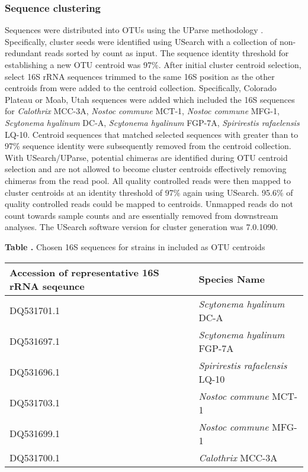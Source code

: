 \subsubsection{Sequence clustering}
Sequences were distributed into OTUs using the UParse methodology
\citep{23955772}. Specifically, cluster seeds were identified using USearch with
a collection of non-redundant reads sorted by count as input. The sequence
identity threshold for establishing a new OTU centroid was 97\%. After initial
cluster centroid selection, select 16S rRNA sequences trimmed to the same 16S
position as the other centroids from \citet{Yeager} were added to the centroid
collection. Specifically, \citet{Yeager} Colorado Plateau or Moab, Utah
sequences were added which included the 16S sequences for \textit{Calothrix}
MCC-3A, \textit{Nostoc commune} MCT-1, \textit{Nostoc commune} MFG-1,
\textit{Scytonema hyalinum} DC-A, \textit{Scytonema hyalinum} FGP-7A,
\textit{Spirirestis rafaelensis} LQ-10. Centroid sequences that matched
selected \citet{Yeager} sequences with greater than to 97\% sequence identity
were subsequently removed from the centroid collection. With USearch/UParse,
potential chimeras are identified during OTU centroid selection
and are not allowed to become cluster centroids effectively removing chimeras
from the read pool. All quality controlled reads were then mapped to cluster
centroids at an identity threshold of 97\% again using USearch. 95.6\% of
quality controlled reads could be mapped to centroids. Unmapped reads do not
count towards sample counts and are essentially removed from downstream
analyses. The USearch software version for cluster generation was 7.0.1090.

\begin{table}

\textbf{
\label{table:yeager_2006} 
Table . }{Chosen 16S sequences for strains in \citet{Yeager} included as OTU centroids}

{\begin{tabular}{ l l }
\toprule
\textbf{Accession of representative 16S rRNA seqeunce} & \textbf{Species Name} \\ \midrule 
DQ531701.1 & \textit{Scytonema hyalinum} DC-A \\ \midrule 
DQ531697.1 & \textit{Scytonema hyalinum} FGP-7A \\ \midrule
DQ531696.1 & \textit{Spirirestis rafaelensis} LQ-10 \\ \midrule
DQ531703.1 & \textit{Nostoc commune} MCT-1 \\ \midrule
DQ531699.1 & \textit{Nostoc commune} MFG-1 \\ \midrule 
DQ531700.1 & \textit{Calothrix} MCC-3A  \\ 
\bottomrule
\end{tabular}}{} 

\end{table}

